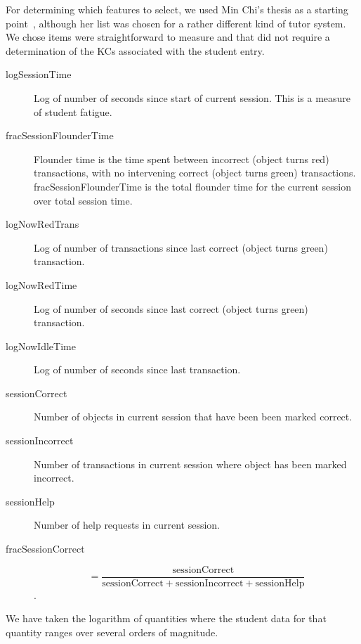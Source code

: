 \documentclass{edm_template}
\begin{document}
For determining which features to select, we used Min Chi's thesis
as a starting point~\citeyear{chi_micro-level_2009}, 
although her list was chosen for a rather different kind of tutor
system.  We chose items were straightforward to measure and that did
not require a determination of the KCs associated with the student entry.
%
\begin{description}

\item[logSessionTime] Log of number of seconds since start of current
  session.  This is a measure of student fatigue.

\item[fracSessionFlounderTime] Flounder time is the time spent between 
incorrect (object turns red) transactions, with no intervening correct 
(object turns green) transactions. 
  fracSessionFlounderTime is the total flounder
time for the current session over total session time.

\item[logNowRedTrans] Log of number of transactions since last
  correct (object turns green) transaction.

\item[logNowRedTime] Log of number of seconds since last
  correct (object turns green) transaction.

\item[logNowIdleTime] Log of number of seconds since last transaction.

\item[sessionCorrect] Number of objects in current session that have
  been  been marked  correct.

\item[sessionIncorrect] Number of transactions in current session where 
   object has been marked  incorrect.

\item[sessionHelp] Number of help requests in current session.

\item[fracSessionCorrect] \[=\frac{\mathrm{sessionCorrect}}{\mathrm{sessionCorrect}+\mathrm{sessionIncorrect}+\mathrm{sessionHelp}}\].

\end{description}
%
We have taken the logarithm of quantities where the student data
for that quantity ranges over several orders of magnitude.

\end{document}
